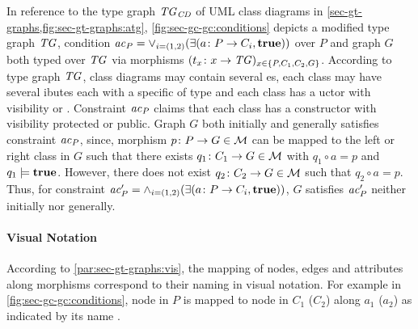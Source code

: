 \begin{example}
In reference to the type graph $\mathit{TG}_\mathit{CD}$ of UML class diagrams in \cref{sec-gt-graphs,fig:sec-gt-graphs:atg}, \cref{fig:sec-gc-gc:conditions} depicts a modified type graph $\mathit{TG}$, condition $\mathit{ac}_P=\vee_{i=(1,2)}(\exists(a\colon P \to C_i,\textbf{true}))$ over $P$ and graph $G$ both typed over $\mathit{TG}$ via morphisms $(t_x\colon x \to \mathit{TG})_{x \in \{P,C_1,C_2,G\}}$.
According to type graph $\mathit{TG}$, class diagrams may contain several es, each class may have several ibutes each with a specific  of type  and each class has a uctor with visibility  or .
Constraint $\mathit{ac}_P$ claims that each class has a constructor with visibility protected or public.
Graph $G$ both initially and generally satisfies constraint $\mathit{ac}_P$, since, morphism $p\colon P \to G \in {\cal M}$ can be mapped to the left or right class in $G$ such that there exists $q_1\colon C_1 \to G \in {\cal M}$ with $q_1 \circ a=p$ and $q_1 \models \textbf{true}$.
However, there does not exist $q_2\colon C_2 \to G \in {\cal M}$ such that $q_2 \circ a=p$.
Thus, for constraint $\mathit{ac}'_P=\wedge_{i=(1,2)}(\exists(a\colon P \to C_i,\textbf{true}))$, $G$ satisfies $\mathit{ac}'_P$ neither initially nor generally.
\envEndMarker
\end{example}

\paragraph*{Visual Notation}
According to \cref{par:sec-gt-graphs:vis}, the mapping of nodes, edges and attributes along morphisms correspond to their naming in visual notation.
For example in \cref{fig:sec-gc-gc:conditions}, node  in $P$ is mapped to node  in $C_1$ ($C_2$) along $a_1$ ($a_2$) as indicated by its name .

